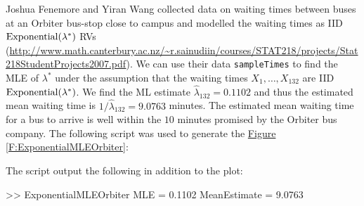 \begin{labwork}\label{LW:ExponentialMLEOrbiter}
Joshua Fenemore and Yiran Wang collected data on waiting times between buses at an Orbiter bus-stop close to campus and modelled the waiting times as IID $\mbox{{\rm Exponential}}(\lambda^*)$ RVs (\href{http://www.math.canterbury.ac.nz/~r.sainudiin/courses/STAT218/projects/Stat218StudentProjects2007.pdf}{\url{http://www.math.canterbury.ac.nz/~r.sainudiin/courses/STAT218/projects/Stat218StudentProjects2007.pdf}}).  We can use their data {\tt sampleTimes} to find the MLE of $\lambda^*$ under the assumption that the waiting times $X_1,\ldots,X_{132}$ are IID $\mbox{{\rm Exponential}}(\lambda^*)$.  We find the ML estimate $\widehat{\lambda}_{132}=0.1102$ and thus the estimated mean waiting time is $1/\widehat{\lambda}_{132}=9.0763$ minutes.  The estimated mean waiting time for a bus to arrive is well within the $10$ minutes promised by the Orbiter bus company.  The following script was used to generate the \hyperref[F:ExponentialMLE]{Figure \ref*{F:ExponentialMLEOrbiter}}:


The script output the following in addition to the plot:
\begin{VrbM}
>> ExponentialMLEOrbiter
MLE =    0.1102
MeanEstimate =    9.0763
\end{VrbM}
\end{labwork}

